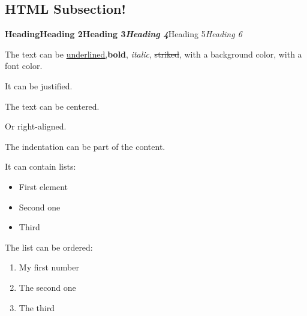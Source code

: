 \documentclass[letter,titlepage,oneside,11pt]{report}%
\begin{document}
\subsection{HTML Subsection!}%
\par%
\par%
\begin{FlushLeft}%
{\huge \textbf{Heading}}{\LARGE \textbf{Heading 2}}{\Large \textbf{Heading 3}}{\large \textit{\textbf{Heading 4}}}{\large Heading 5}{\large \textit{Heading 6}}%
\end{FlushLeft}%
\par%
\begin{FlushLeft}%
The text can be \underline{underlined,}\textbf{bold}, \textit{italic}, \sout{striked}, with a \colorbox[rgb]{0.8,0.8,0.0}{background color}, with a {\color[rgb]{0.5568627450980392,0.26666666666666666,0.6784313725490196}font color.}%
\end{FlushLeft}%
\par%
\begin{justify}%
It can be justified.%
\end{justify}%
\par%
\begin{Center}%
The text can be centered.%
\end{Center}%
\par%
\begin{FlushRight}%
Or right-aligned.%
\end{FlushRight}%
\par%
\begin{FlushLeft}%
\begin{adjustwidth}{40pt}{}%
The indentation can be part of the content.%
\end{adjustwidth}%
\end{FlushLeft}%
\par%
\begin{FlushLeft}%
It can contain lists:%
\end{FlushLeft}%
\begin{itemize}%
\item First element%
\item Second one%
\item Third%
\end{itemize}%
\par%
\begin{FlushLeft}%
The list can be ordered:%
\end{FlushLeft}%
\begin{enumerate}%
\item My first number%
\item The second one%
\item The third%
\end{enumerate}%
\end{document}
